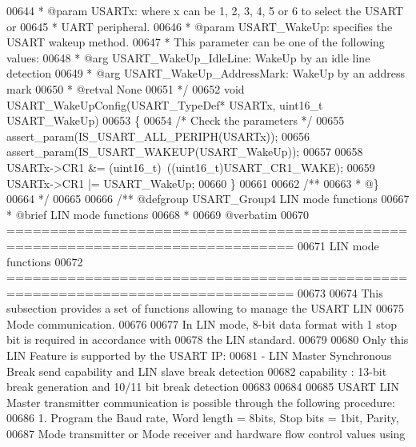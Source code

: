\begin{DoxyCode}
00644 \textcolor{comment}{  * @param  USARTx: where x can be 1, 2, 3, 4, 5 or 6 to select the USART or }
00645 \textcolor{comment}{  *         UART peripheral.}
00646 \textcolor{comment}{  * @param  USART\_WakeUp: specifies the USART wakeup method.}
00647 \textcolor{comment}{  *          This parameter can be one of the following values:}
00648 \textcolor{comment}{  *            @arg USART\_WakeUp\_IdleLine: WakeUp by an idle line detection}
00649 \textcolor{comment}{  *            @arg USART\_WakeUp\_AddressMark: WakeUp by an address mark}
00650 \textcolor{comment}{  * @retval None}
00651 \textcolor{comment}{  */}
00652 \textcolor{keywordtype}{void} USART_WakeUpConfig(USART\_TypeDef* USARTx, uint16\_t USART\_WakeUp)
00653 \{
00654   \textcolor{comment}{/* Check the parameters */}
00655   assert_param(IS\_USART\_ALL\_PERIPH(USARTx));
00656   assert_param(IS\_USART\_WAKEUP(USART\_WakeUp));
00657 
00658   USARTx->CR1 &= (uint16\_t)~((uint16\_t)USART_CR1_WAKE);
00659   USARTx->CR1 |= USART\_WakeUp;
00660 \}
00661 
00662 \textcolor{comment}{/**}
00663 \textcolor{comment}{  * @\}}
00664 \textcolor{comment}{  */}
00665 
00666 \textcolor{comment}{/** @defgroup USART\_Group4 LIN mode functions}
00667 \textcolor{comment}{ *  @brief   LIN mode functions }
00668 \textcolor{comment}{ *}
00669 \textcolor{comment}{@verbatim   }
00670 \textcolor{comment}{ ===============================================================================}
00671 \textcolor{comment}{                                LIN mode functions}
00672 \textcolor{comment}{ ===============================================================================  }
00673 \textcolor{comment}{}
00674 \textcolor{comment}{  This subsection provides a set of functions allowing to manage the USART LIN }
00675 \textcolor{comment}{  Mode communication.}
00676 \textcolor{comment}{  }
00677 \textcolor{comment}{  In LIN mode, 8-bit data format with 1 stop bit is required in accordance with }
00678 \textcolor{comment}{  the LIN standard.}
00679 \textcolor{comment}{}
00680 \textcolor{comment}{  Only this LIN Feature is supported by the USART IP:}
00681 \textcolor{comment}{    - LIN Master Synchronous Break send capability and LIN slave break detection}
00682 \textcolor{comment}{      capability :  13-bit break generation and 10/11 bit break detection}
00683 \textcolor{comment}{}
00684 \textcolor{comment}{}
00685 \textcolor{comment}{  USART LIN Master transmitter communication is possible through the following procedure:}
00686 \textcolor{comment}{     1. Program the Baud rate, Word length = 8bits, Stop bits = 1bit, Parity, }
00687 \textcolor{comment}{        Mode transmitter or Mode receiver and hardware flow control values using }

\end{DoxyCode}
